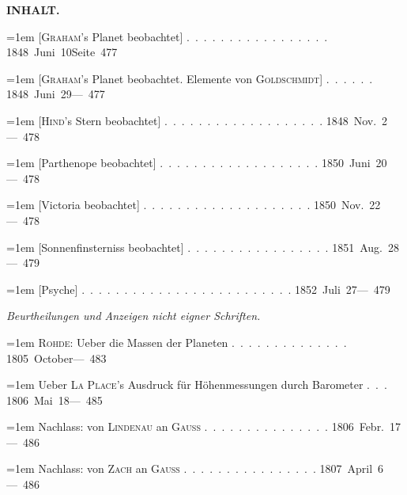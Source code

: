 \clearpage
{}
\noindent\makebox[10mm][l]{}%
\parbox[b]{\dimexpr\textwidth-20mm\relax}{\centering\small\textbf{INHALT.}}%
\par\nobreak\medskip
\begingroup
\raggedright
\noindent\hangindent=1em [\textsc{Graham}'s Planet beobachtet] \mbox{.\ .\ .\ .\ .\ .\ .\ .\ .\ .\ .\ .\ .\ .\ .\ .\ .} \hfill\mbox{1848 Juni 10}\quad\mbox{Seite 477}\par\smallskip
\noindent\hangindent=1em [\textsc{Graham}'s Planet beobachtet. Elemente von \textsc{Goldschmidt}] \mbox{.\ .\ .\ .\ .\ .} \hfill\mbox{1848 Juni 29}\quad\mbox{--- 477}\par\smallskip
\noindent\hangindent=1em [\textsc{Hind}'s Stern beobachtet] \mbox{.\ .\ .\ .\ .\ .\ .\ .\ .\ .\ .\ .\ .\ .\ .\ .\ .\ .\ .} \hfill\mbox{1848 Nov. 2}\quad\mbox{--- 478}\par\smallskip
\noindent\hangindent=1em [Parthenope beobachtet] \mbox{.\ .\ .\ .\ .\ .\ .\ .\ .\ .\ .\ .\ .\ .\ .\ .\ .\ .\ .} \hfill\mbox{1850 Juni 20}\quad\mbox{--- 478}\par\smallskip
\noindent\hangindent=1em [Victoria beobachtet] \mbox{.\ .\ .\ .\ .\ .\ .\ .\ .\ .\ .\ .\ .\ .\ .\ .\ .\ .\ .\ .} \hfill\mbox{1850 Nov. 22}\quad\mbox{--- 478}\par\smallskip
\noindent\hangindent=1em [Sonnenfinsterniss beobachtet] \mbox{.\ .\ .\ .\ .\ .\ .\ .\ .\ .\ .\ .\ .\ .\ .\ .\ .} \hfill\mbox{1851 Aug. 28}\quad\mbox{--- 479}\par\smallskip
\noindent\hangindent=1em [Psyche] \mbox{.\ .\ .\ .\ .\ .\ .\ .\ .\ .\ .\ .\ .\ .\ .\ .\ .\ .\ .\ .\ .\ .\ .\ .\ .} \hfill\mbox{1852 Juli 27}\quad\mbox{--- 479}\par\smallskip
\bigskip\noindent\textit{Beurtheilungen und Anzeigen nicht eigner Schriften.}\par\medskip
\noindent\hangindent=1em \textsc{Rohde}: Ueber die Massen der Planeten \mbox{.\ .\ .\ .\ .\ .\ .\ .\ .\ .\ .\ .\ .\ .} \hfill\mbox{1805 October}\quad\mbox{--- 483}\par\smallskip
\noindent\hangindent=1em Ueber \textsc{La Place}'s Ausdruck für Höhenmessungen durch Barometer \mbox{.\ .\ .} \hfill\mbox{1806 Mai 18}\quad\mbox{--- 485}\par\smallskip
\noindent\hangindent=1em Nachlass: von \textsc{Lindenau} an \textsc{Gauss} \mbox{.\ .\ .\ .\ .\ .\ .\ .\ .\ .\ .\ .\ .\ .\ .} \hfill\mbox{1806 Febr. 17}\quad\mbox{--- 486}\par\smallskip
\noindent\hangindent=1em Nachlass: von \textsc{Zach} an \textsc{Gauss} \mbox{.\ .\ .\ .\ .\ .\ .\ .\ .\ .\ .\ .\ .\hspace{.6em}\ .\ .\ .} \hfill\mbox{1807 April 6}\quad\mbox{--- 486}\par\smallskip
